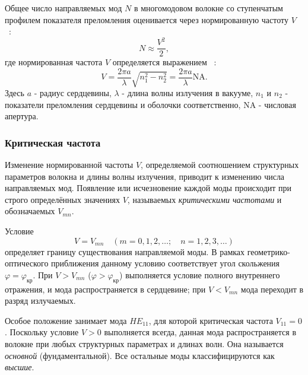 \documentclass[14pt,a4paper]{extarticle}
\numberwithin{equation}{section}
\numberwithin{figure}{section}
\numberwithin{table}{section}
\begin{document}
Общее число направляемых мод $N$ в многомодовом волокне со ступенчатым профилем показателя преломления оценивается через нормированную частоту $V$ ~\cite{volokonno2012}:
\begin{equation}
    N \approx \frac{V^2}{2},
    \label{eq:N_modes}
\end{equation}
где нормированная частота $V$ определяется выражением ~\cite{velichansky2007}:
\begin{equation}
    V = \frac{2\pi a}{\lambda} \sqrt{n_1^2 - n_2^2} = \frac{2\pi a}{\lambda} \mathrm{NA}.
    \label{eq:V_number}
\end{equation}
Здесь $a$ - радиус сердцевины, $\lambda$ - длина волны излучения в вакууме, $n_1$ и $n_2$ - показатели преломления сердцевины и оболочки соответственно, $\mathrm{NA}$ - числовая апертура.











\subsubsection{Критическая частота }

Изменение нормированной частоты $V$, определяемой соотношением структурных параметров волокна и длины волны излучения, приводит к изменению числа направляемых мод. Появление или исчезновение каждой моды происходит при строго определённых значениях $V$, называемых \textit{критическими частотами} и обозначаемых $V_{mn}$.

Условие
\begin{equation}
    V = V_{mn} \quad (m = 0, 1, 2, \dots; \quad n = 1, 2, 3, \dots)
    \label{eq:Vmn}
\end{equation}
определяет границу существования направляемой моды. В рамках геометрико-оптического приближения данному условию соответствует угол скольжения $\varphi = \varphi_\text{кр}$. При $V > V_{mn}$ ($\varphi > \varphi_\text{кр}$) выполняется условие полного внутреннего отражения, и мода распространяется в сердцевине; при $V < V_{mn}$ мода переходит в разряд излучаемых.

Особое положение занимает мода $HE_{11}$, для которой критическая частота $V_{11} = 0$. Поскольку условие $V > 0$ выполняется всегда, данная мода распространяется в волокне при любых структурных параметрах и длинах волн. Она называется \textit{основной} (фундаментальной). Все остальные моды классифицируются как \textit{высшие}.
\end{document}
